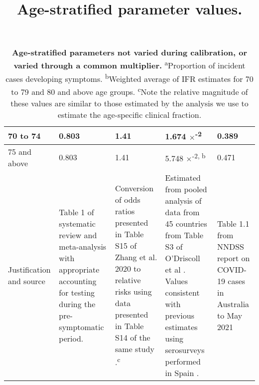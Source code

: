 \begin{table}[ht]
\begin{tabular}[ht]{| p{2cm} | p{2.5cm} | p{3cm} | p{3cm} | p{2.5cm}|}
        \hline
        70 to 74 & 0.803 & 1.41 & 1.674 $\times$\textsuperscript{-2} & 0.389 \\
        \hline
        75 and above & 0.803 & 1.41 & 5.748 $\times$\textsuperscript{-2, b} & 0.471 \\
        \hline
        Justification and source & 
        Table 1 of systematic review and meta-analysis with appropriate accounting for testing during the pre-symptomatic period. & 
        Conversion of odds ratios presented in Table S15 of Zhang et al. 2020 to relative risks using data presented in Table S14 of the same study \cite{RN7}.\textsuperscript{c} &
        Estimated from pooled analysis of data from 45 countries from Table S3 of O'Driscoll et al \cite{RN6}. Values consistent with previous estimates using serosurveys performed in Spain \cite{RN21}. &
        Table 1.1 from NNDSS report on COVID-19 cases in Australia to May 2021 \\ \hline
	\end{tabular}
	\title{Age-stratified parameter values.}
	\caption{\textbf{Age-stratified parameters not varied during calibration, or varied through a common multiplier.} \textsuperscript{a}Proportion of incident cases developing symptoms. \textsuperscript{b}Weighted average of IFR estimates for 70 to 79 and 80 and above age groups. \textsuperscript{c}Note the relative magnitude of these values are similar to those estimated by the analysis we use to estimate the age-specific clinical fraction.}
	\label{tab:age_params}
\end{table}

\clearpage